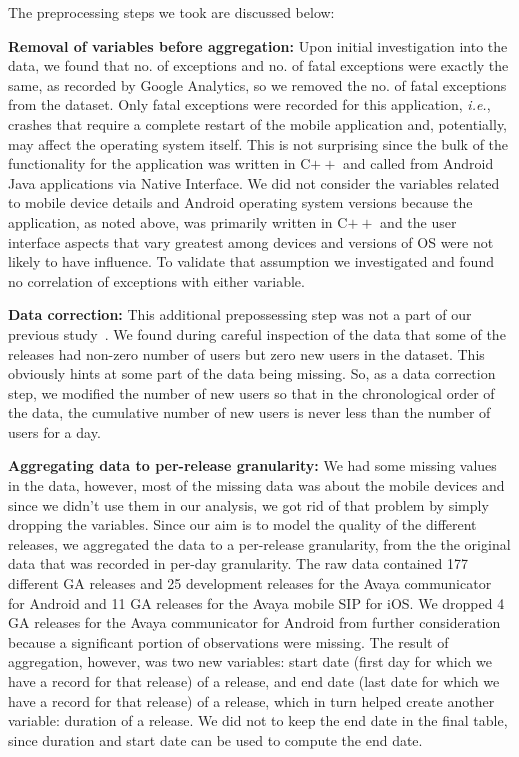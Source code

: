 \documentclass[smallcondensed]{svjour3}     %
\begin{document}
The preprocessing steps we took are discussed below:

\textbf{Removal of variables before aggregation: } Upon initial
investigation into the data, we found that no. of exceptions and
no. of fatal exceptions were exactly the same, as recorded by Google
Analytics, so we removed the no. of fatal exceptions from the
dataset. Only fatal exceptions were recorded for this application,
\emph{i.e.}, crashes that require a complete restart of the mobile
application and, potentially, may affect the operating system
itself.  This is not surprising since the bulk of the functionality
for the application was written in C$++$ and called from Android
Java applications via Native Interface.
We did not consider the variables related to mobile device
details and Android operating system versions because the
application, as noted above, was primarily written in C$++$ and the
user interface aspects that vary greatest among devices and versions
of OS were not likely to have influence. To validate that
assumption we investigated and found no
correlation of exceptions with either variable. 

\noindent
\textbf{Data correction:}
This additional prepossessing step was not a part of our previous study~\cite{dey2018modeling}.
We found during careful inspection of the data that some of the releases had non-zero number
of users but zero new users in the dataset. This obviously hints at some part of the data 
being missing. So, as a data correction step, we modified the number of new users so that 
in the chronological order of the data, the cumulative number of new users is never 
less than the number of users for a day.

\noindent
\textbf{Aggregating data to per-release granularity:}
We had some missing values in the data, however, most of the missing data was about the
mobile devices and since we didn't use them in our analysis, we got rid of that
problem by simply dropping the variables. Since our aim is to model the quality of the
different releases, we aggregated the data to a per-release 
granularity, from the the original data that was recorded in per-day granularity. 
The raw data contained 177 different GA releases and 25 development releases for the 
Avaya communicator for Android and 11 GA releases for the Avaya mobile SIP for iOS. 
We dropped 4 GA releases for the Avaya communicator for Android from further 
consideration because a significant
portion of observations were missing. The result of aggregation, however,
was two new variables: start date (first day for which we have a
record for that release) of a release, and end date (last date for
which we have a record for that release) of a release, which in turn
helped create another variable: duration of a release. We did
not to keep the end date in the final table, since duration and
start date can be used to compute the end date.
\end{document}
